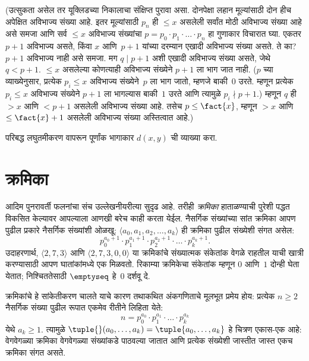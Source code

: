 (उत्सुकता असेल तर यूक्लिडच्या निकालाचा संक्षिप्त पुरावा असा. दोनपेक्षा
लहान मूल्यांसाठी दोन हीच अपेक्षित अविभाज्य संख्या आहे. इतर मूल्यांसाठी
$p_n$ ही $\le x$ असलेली सर्वांत मोठी अविभाज्य संख्या आहे असे समजा आणि
सर्व $\le x$ अविभाज्य संख्यांचा $p =
p_0\cdot p_1 \cdot \dots \cdot p_n$ हा गुणाकार विचारात घ्या. एकतर $p+1$
अविभाज्य असते, किंवा $x$ आणि~$p+1$ यांच्या दरम्यान एखादी अविभाज्य संख्या
असते. ते का? $p+1$ अविभाज्य नाही असे समजा. मग $q \mid p+1$ अशी एखादी
अविभाज्य संख्या असते, जेथे $q < p+1$. $\le x$ असलेल्या कोणत्याही अविभाज्य
संख्येने $p+1$ ला भाग जात नाही. ($p$ च्या व्याख्येनुसार, प्रत्येक
$p_i \le x$ अविभाज्य संख्येने~$p$ ला भाग जातो, म्हणजे बाकी~$0$ उरते.
म्हणून प्रत्येक $p_i \le x$ अविभाज्य संख्येने $p+1$ ला भागल्यास बाकी~$1$
उरते आणि त्यामुळे $p_i \nmid p+1$.) म्हणून $q$ ही $> x$ आणि $< p+1$
असलेली अविभाज्य संख्या आहे. तसेच $p \le \fact{x}$, म्हणून $> x$ आणि $\le
\fact{x}+1$ असलेली अविभाज्य संख्या अस्तित्वात आहे.)

\begin{prob}
परिबद्ध लघुतमीकरण वापरून पूर्णांक भागाकार $d(x, y)$ ची व्याख्या करा.
\end{prob}











\section{क्रमिका}\label{cmp:rec:seq:sec}

आदिम पुनरावर्ती फलनांचा संच उल्लेखनीयरीत्या सुदृढ आहे. तरीही
\emph{क्रमिका} हाताळण्याची पुरेशी पद्धत विकसित केल्यावर आपल्याला आणखी बरेच
काही करता येईल. नैसर्गिक संख्यांच्या सांत क्रमिका आपण पुढील प्रकारे नैसर्गिक
संख्यांशी ओळखू: $\langle a_0, a_1, a_2, \dots, a_k \rangle$ ही क्रमिका
पुढील संख्येशी संगत असेल:
\[p_0^{a_0+1} \cdot p_1^{a_1+1} \cdot p_2^{a_2+1} \cdot \dots \cdot
p_k^{a_k+1}.
\]
उदाहरणार्थ, $\langle 2, 7, 3\rangle$ आणि $\langle 2, 7, 3, 0, 0 \rangle$
या क्रमिकांचे संख्यात्मक संकेतांक वेगळे राहतील याची खात्री करण्यासाठी आपण
घातांकांमध्ये एक मिळवतो. रिकाम्या क्रमिकेचा संकेतांक म्हणून $0$ आणि~$1$
दोन्ही घेता येतात; निश्चिततेसाठी $\emptyseq$ हे~$0$ दर्शवू दे.

क्रमिकांचे हे सांकेतीकरण चालते याचे कारण तथाकथित अंकगणिताचे मूलभूत प्रमेय
होय: प्रत्येक $n \ge 2$ नैसर्गिक संख्या पुढील रूपात एकमेव रीतीने लिहिता
येते:
\[n = p_0^{a_0} \cdot p_1^{a_1} \cdot \dots \cdot p_k^{a_k}
\]
येथे $a_k \ge 1$. त्यामुळे $\tuple{}(a_0,
\dots, a_k) = \tuple{a_0, \dots, a_k}$ हे चित्रण एकास-एक आहे: वेगवेगळ्या
क्रमिका वेगवेगळ्या संख्यांकडे पाठवल्या जातात आणि प्रत्येक संख्येशी जास्तीत
जास्त एकच क्रमिका संगत असते.

